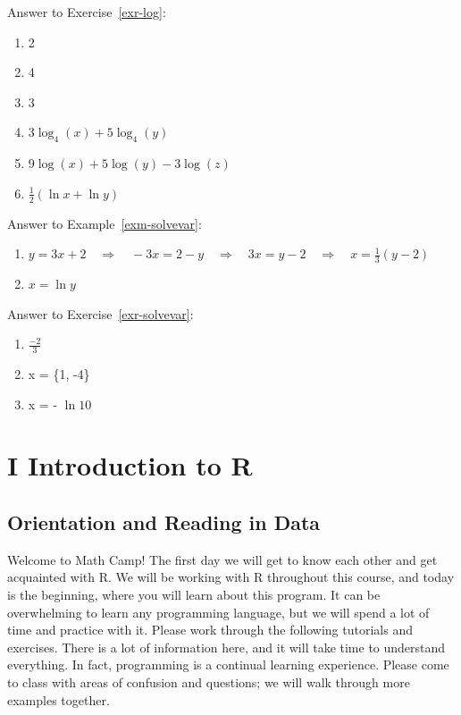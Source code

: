 \documentclass[
  letterpaper,
]{book}
\providecommand{\tightlist}{%
  \setlength{\itemsep}{0pt}\setlength{\parskip}{0pt}}\usepackage{longtable,booktabs,array}
\theoremstyle{definition}
\theoremstyle{definition}
\theoremstyle{plain}
\theoremstyle{definition}
\theoremstyle{plain}
\theoremstyle{plain}
\theoremstyle{remark}
\begin{document}
Answer to Exercise~\ref{exr-log}:

\begin{enumerate}
\def\labelenumi{\arabic{enumi}.}
\tightlist
\item
  2
\item
  4
\item
  3
\item
  \(3\log_4(x) + 5\log_4(y)\)
\item
  \(9\log(x) + 5\log(y) - 3\log(z)\)
\item
  \(\frac{1}{2}(\ln{x} + \ln{y})\)
\end{enumerate}

Answer to Example~\ref{exm-solvevar}:

\begin{enumerate}
\def\labelenumi{\arabic{enumi}.}
\tightlist
\item
  \(y=3x+2 \quad\Longrightarrow\quad -3x=2-y \quad\Longrightarrow\quad 3x=y-2 \quad\Longrightarrow\quad x=\frac{1}{3}(y-2)\)
\item
  \(x = \ln{y}\)
\end{enumerate}

Answer to Exercise~\ref{exr-solvevar}:

\begin{enumerate}
\def\labelenumi{\arabic{enumi}.}
\tightlist
\item
  \(\frac{-2}{3}\)
\item
  x = \{1, -4\}
\item
  x = - \(\ln10\)
\end{enumerate}

\part{I Introduction to R}

\hypertarget{orientation-and-reading-in-data}{%
\chapter{Orientation and Reading in
Data}\label{orientation-and-reading-in-data}}

Welcome to Math Camp! The first day we will get to know each other and
get acquainted with R. We will be working with R throughout this course,
and today is the beginning, where you will learn about this program. It
can be overwhelming to learn any programming language, but we will spend
a lot of time and practice with it. Please work through the following
tutorials and exercises. There is a lot of information here, and it will
take time to understand everything. In fact, programming is a continual
learning experience. Please come to class with areas of confusion and
questions; we will walk through more examples together.
\end{document}
